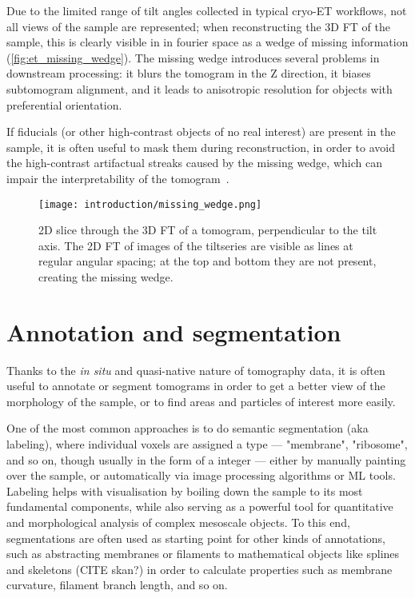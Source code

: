 Due to the limited range of tilt angles collected in typical cryo-ET workflows, not all views of the sample are represented; when reconstructing the 3D FT of the sample, this is clearly visible in in fourier space as a wedge of missing information (\autoref{fig:et_missing_wedge}).
The missing wedge introduces several problems in downstream processing: it blurs the tomogram in the Z direction, it biases subtomogram alignment, and it leads to anisotropic resolution for objects with preferential orientation.

If fiducials (or other high-contrast objects of no real interest) are present in the sample, it is often useful to mask them during reconstruction, in order to avoid the high-contrast artifactual streaks caused by the missing wedge, which can impair the interpretability of the tomogram~\cite{tegunovRealtimeCryoelectronMicroscopy2019,burtTeamtomoFidder2024}.

\begin{figure}[ht]
    \centering
    \texttt{[image: introduction/missing\_wedge.png]}
    \caption[Missing wedge]{2D slice through the 3D FT of a tomogram, perpendicular to the tilt axis. The 2D FT of images of the tiltseries are visible as lines at regular angular spacing; at the top and bottom they are not present, creating the missing wedge.}
    \label{fig:et_missing_wedge}
\end{figure}

\section{Annotation and segmentation}\label{et_annotation_segmentation}
Thanks to the \textit{in situ} and quasi-native nature of tomography data, it is often useful to annotate or segment tomograms in order to get a better view of the morphology of the sample, or to find areas and particles of interest more easily.

One of the most common approaches is to do semantic segmentation (aka labeling), where individual voxels are assigned a type --- "membrane", "ribosome", and so on, though usually in the form of a integer --- either by manually painting over the sample, or automatically via image processing algorithms or ML tools.
Labeling helps with visualisation by boiling down the sample to its most fundamental components, while also serving as a powerful tool for quantitative and morphological analysis of complex mesoscale objects.
To this end, segmentations are often used as starting point for other kinds of annotations, such as abstracting membranes or filaments to mathematical objects like splines and skeletons (CITE skan?) in order to calculate properties such as membrane curvature, filament branch length, and so on.

